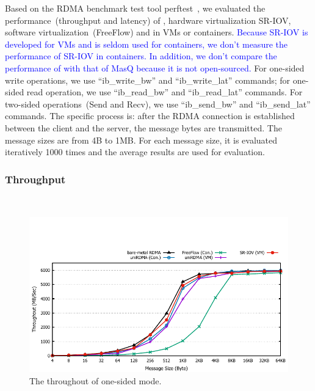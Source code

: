 Based on the RDMA benchmark test tool perftest~\cite{perftest}, we evaluated the performance~(throughput and latency) of \native, hardware virtualization SR-IOV,  software virtualization~(FreeFlow) and \sys in VMs or containers. \textcolor{blue}{Because SR-IOV is developed for VMs and is seldom used for containers, we don't measure the performance of SR-IOV in containers.} \textcolor{blue}{In addition, we don't compare the performance of \sys with that of MasQ because it is not open-sourced.} For one-sided write operations, we use ``ib\_write\_bw'' and ``ib\_write\_lat'' commands; for one-sided read operation, we use ``ib\_read\_bw'' and ``ib\_read\_lat'' commands. For two-sided operations~(Send and Recv), we use ``ib\_send\_bw'' and ``ib\_send\_lat'' commands. The specific process is: after the RDMA connection is established between the client and the server, the message bytes are transmitted. The message sizes are from 4B to 1MB. For each message size,  it is evaluated iteratively 1000 times and the average results are used for evaluation.  

\subsubsection{\textbf{Throughput}}
\
\noindent

\begin{figure}[!ht]
	\centering
	\includegraphics[width=1.0\linewidth]{images/write-bw.pdf}
	\caption{The throughout of one-sided mode.}
	\label{fig:write-bw}
\end{figure}



